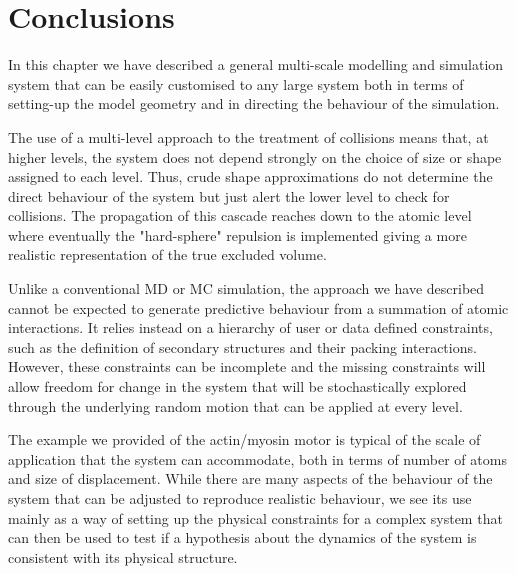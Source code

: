 \section{Conclusions}

In this chapter we have described a general multi-scale modelling
and simulation system that can be easily customised to any large
system both in terms of setting-up the model geometry and in
directing the behaviour of the simulation.

The use of a multi-level approach to the treatment of collisions
means that, at higher levels, the system does not depend strongly
on the choice of size or shape assigned to each level.   Thus,
crude shape approximations do not determine the direct behaviour
of the system but just alert the lower level to check for
collisions.   The propagation of this cascade reaches down to the 
atomic level where eventually the "hard-sphere" repulsion is
implemented giving a more realistic representation of the true
excluded volume. 

Unlike a conventional MD or MC simulation, the approach we have
described cannot be expected to generate predictive behaviour 
from a summation of atomic interactions.  It relies instead on
a hierarchy of user or data defined constraints, such as the 
definition of secondary structures and their packing interactions.
However, these constraints can be incomplete and the missing 
constraints will allow freedom for change in the system that
will be stochastically explored through the underlying random
motion that can be applied at every level.

The example we provided of the actin/myosin motor is typical of
the scale of application that the system can accommodate, both 
in terms of number of atoms and size of displacement.  While
there are many aspects of the behaviour of the system that can
be adjusted to reproduce realistic behaviour, we see its use
mainly as a way of setting up the physical constraints for a 
complex system that can then be used to test if a hypothesis 
about the dynamics of the system is consistent with its physical
structure.

